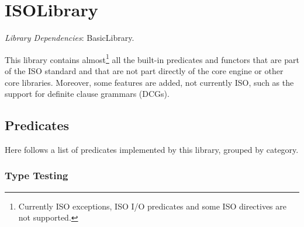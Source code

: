 \clearpage

\section{ISOLibrary}
\label{sec:iso-library}

\noindent \emph{Library Dependencies}: BasicLibrary.

This library contains almost\footnote{Currently ISO exceptions, ISO
I/O predicates and some ISO directives are not supported.} all the
built-in predicates and functors that are part of the ISO standard
and that are not part directly of the \tuprolog{} core engine or
other core libraries.
%
Moreover, some features are added, not currently ISO, such as the
support for definite clause grammars (DCGs).
%

\subsection{Predicates}

\noindent Here follows a list of predicates implemented by this
library, grouped by category.


%
%

\subsubsection{Type Testing}

